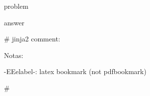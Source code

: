 
\clearpage



\begin{Exercise}[title={ {{ename}} }]
{{ problem }}
\end{Exercise}

\clearpage

\begin{Answer}
{{ answer }}
\end{Answer}

\clearpage



{# jinja2 comment: 

Notas:

-EE{{elabel}}-: latex bookmark (not pdfbookmark)



#}

